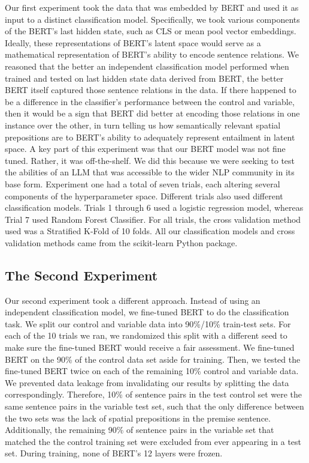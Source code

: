 \documentclass[12pt,letterpaper]{article}
\begin{document}
Our first experiment took the data that was embedded by BERT and used it as input to a distinct classification model. Specifically, we took various components of the BERT's last hidden state, such as CLS or mean pool vector embeddings. Ideally, these representations of BERT's latent space would serve as a mathematical representation of BERT's ability to encode sentence relations. We reasoned that the better an independent classification model performed when trained and tested on last hidden state data derived from BERT, the better BERT itself captured those sentence relations in the data. If there happened to be a difference in the classifier's performance between the control and variable, then it would be a sign that BERT did better at encoding those relations in one instance over the other, in turn telling us how semantically relevant spatial prepositions are to BERT's ability to adequately represent entailment in latent space. A key part of this experiment was that our BERT model was not fine tuned. Rather, it was off-the-shelf. We did this because we were seeking to test the abilities of an LLM that was accessible to the wider NLP community in its base form. Experiment one had a total of seven trials, each altering several components of the hyperparameter space. Different trials also used different classification models. Trials 1 through 6 used a logistic regression model, whereas Trial 7 used Random Forest Classifier. For all trials, the cross validation method used was a Stratified K-Fold of 10 folds. All our classification models and cross validation methods came from the scikit-learn Python package.

\subsection{The Second Experiment}

Our second experiment took a different approach. Instead of using an independent classification model, we fine-tuned BERT to do the classification task.
We split our control and variable data into 90\%/10\% train-test sets. For each of the 10 trials we ran, we randomized this split with a different seed to make sure the fine-tuned BERT would receive a fair assessment. We fine-tuned BERT on the 90\% of the control data set aside for training. Then, we tested the fine-tuned BERT twice on each of the remaining 10\% control and variable data. We prevented data leakage from invalidating our results by splitting the data correspondingly. Therefore, 10\% of sentence pairs in the test control set were the same sentence pairs in the variable test set, such that the only difference between the two sets was the lack of spatial prepositions in the premise sentence. Additionally, the remaining 90\% of sentence pairs in the variable set that matched the the control training set were excluded from ever appearing in a test set. During training, none of BERT's 12 layers were frozen.
\end{document}
